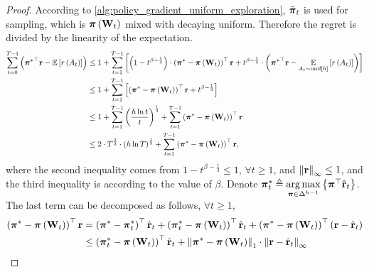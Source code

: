 \begin{proof}
    According to \cref{alg:policy_gradient_uniform_exploration}, $\tilde{{\boldsymbol{\pi}}}_t$ is used for sampling, which is ${\boldsymbol{\pi}}\left( {\mathbf{W}}_t \right)$ mixed with decaying uniform. Therefore the regret is divided by the linearity of the expectation.
\begin{equation}
\label{eq:total_regret_decomposition}
\begin{split}
    \sum\limits_{t=0}^{T-1}{ \left( {{\boldsymbol{\pi}}^*}^\top {\mathbf{r}} - {\mathbb{E}} \left[ r\left(A_t\right) \right] \right) } &\le 1 + \sum\limits_{t=1}^{T-1}{ \left[ \left( 1 - t^{ \beta - \frac{1}{3}} \right) \cdot \left( {{\boldsymbol{\pi}}^*} - {\boldsymbol{\pi}}\left( {\mathbf{W}}_t \right) \right)^\top {\mathbf{r}} + t^{ \beta - \frac{1}{3}} \cdot \left( {{\boldsymbol{\pi}}^*}^\top {\mathbf{r}} - \operatorname*{{\mathbb{E}}}\limits_{A_t \sim {\text{unif}}[h]}{ \left[ r\left(A_t\right) \right] } \right) \right]} \\
    &\le 1 + \sum\limits_{t=1}^{T-1}{ \left[ \left( {{\boldsymbol{\pi}}^*} - {\boldsymbol{\pi}}\left( {\mathbf{W}}_t \right) \right)^\top {\mathbf{r}} + t^{ \beta - \frac{1}{3}} \right]} \\
    &\le 1 + \sum\limits_{t=1}^{T-1}{ \left( \frac{ h \ln{t} }{t} \right)^{\frac{1}{3}} } + \sum\limits_{t=1}^{T-1}{ \left( {{\boldsymbol{\pi}}^*} - {\boldsymbol{\pi}}\left( {\mathbf{W}}_t \right) \right)^\top {\mathbf{r}} } \\
    &\le 2 \cdot T^{\frac{2}{3}} \cdot \left( h \ln{T} \right)^{\frac{1}{3}} + \sum\limits_{t=1}^{T-1}{ \left( {{\boldsymbol{\pi}}^*} - {\boldsymbol{\pi}}\left( {\mathbf{W}}_t \right) \right)^\top {\mathbf{r}} },
\end{split}
\end{equation}
where the second inequality comes from $1 - t^{ \beta - \frac{1}{3}} \le 1$, $\forall t \ge 1$, and $\left\| {\mathbf{r}} \right\|_\infty \le 1$, and the third inequality is according to the value of $\beta$. Denote ${\boldsymbol{\pi}}_t^* \triangleq \operatorname*{arg\,max}\limits_{{\boldsymbol{\pi}} \in \Delta^{h-1}}{\left\{ {\boldsymbol{\pi}}^\top \hat{{\mathbf{r}}}_t\right\}}$. The last term can be decomposed as follows, $\forall t \ge 1$,
\begin{equation}
\label{eq:playing_learning_phase_regret_decomposition}
\begin{split}
    \left( {\rvpi^*} - \rvpi\left( \rmW_t \right) \right)^\top \rvr &= \left( {\rvpi^*} - {\rvpi_t^*} \right)^\top \hat{\rvr}_t + \left( {\rvpi_t^*} - \rvpi\left( \rmW_t \right) \right)^\top \hat{\rvr}_t + \left( {\rvpi^*} - \rvpi\left( \rmW_t \right) \right)^\top \left( \rvr - \hat{\rvr}_t \right) \\
    &\le \left( {\rvpi_t^*} - \rvpi\left( \rmW_t \right) \right)^\top \hat{\rvr}_t  + \left\| \rvpi^* - \rvpi\left( \rmW_t \right) \right\|_1 \cdot \left\| \rvr - \hat{\rvr}_t \right\|_\infty \\

\end{split}
\end{equation}
\end{proof}
